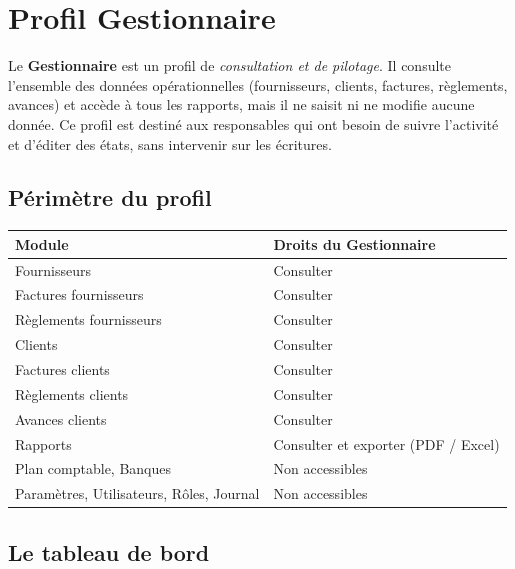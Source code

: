 \chapter{Profil Gestionnaire}

Le \textbf{Gestionnaire} est un profil de \emph{consultation et de pilotage}. Il consulte l'ensemble des données opérationnelles (fournisseurs, clients, factures, règlements, avances) et accède à tous les rapports, mais il ne saisit ni ne modifie aucune donnée. Ce profil est destiné aux responsables qui ont besoin de suivre l'activité et d'éditer des états, sans intervenir sur les écritures.

\section{Périmètre du profil}

\renewcommand{\arraystretch}{1.3}
\begin{longtable}{>{\raggedright\arraybackslash}p{5.4cm} >{\raggedright\arraybackslash}p{9.2cm}}
\toprule
\textbf{Module} & \textbf{Droits du Gestionnaire} \\
\midrule
\endhead
Fournisseurs & Consulter \\
Factures fournisseurs & Consulter \\
Règlements fournisseurs & Consulter \\
Clients & Consulter \\
Factures clients & Consulter \\
Règlements clients & Consulter \\
Avances clients & Consulter \\
Rapports & Consulter et exporter (PDF / Excel) \\
Plan comptable, Banques & Non accessibles \\
Paramètres, Utilisateurs, Rôles, Journal & Non accessibles \\
\bottomrule
\end{longtable}
\renewcommand{\arraystretch}{1}


\section{Le tableau de bord}

